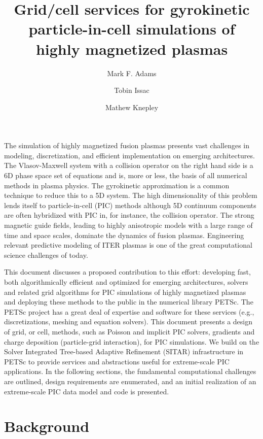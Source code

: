 \documentclass[review]{siamart}
\title{Grid/cell services for gyrokinetic particle-in-cell simulations of highly magnetized plasmas}
\author{Mark F. Adams \and Tobin Issac \and Mathew Knepley}
\begin{document}
\maketitle

The simulation of highly magnetized fusion plasmas presents vast challenges in modeling, discretization, and efficient implementation on emerging architectures.
The Vlasov-Maxwell system with a collision operator on the right hand side is a 6D phase space set of equations and is, more or less, the basis of all numerical methods in plasma physics.
The gyrokinetic approximation is a common technique to reduce this to a 5D system.
The high dimensionality of this problem lends itself to particle-in-cell (PIC) methods although 5D continuum components are often hybridized with PIC in, for instance, the collision operator.
The strong magnetic guide fields, leading to highly anisotropic models with a large range of time and space scales, dominate the dynamics of fusion plasmas.
Engineering relevant predictive modeling of ITER plasmas is one of the great computational science challenges of today.

This document discusses a proposed contribution to this effort: developing fast, both algorithmically efficient and optimized for emerging architectures, solvers and related grid algorithms for PIC simulations of highly magnetized plasmas and deploying these methods to the public in the numerical library PETSc.
The PETSc project has a great deal of expertise and software for these services (e.g., discretizations, meshing and equation solvers).
This document presents a design of grid, or cell, methods, such as Poisson and implicit PIC solvers, gradients and charge deposition (particle-grid interaction), for PIC simulations.
We build on the Solver Integrated Tree-based Adaptive Refinement (SITAR) infrastructure in PETSc to provide services and abstractions useful for extreme-scale PIC applications.
In the following sections, the fundamental computational challenges are outlined, design requirements are enumerated, and an initial realization of an extreme-scale PIC data model and code is presented.

\section{Background}
\end{document}
